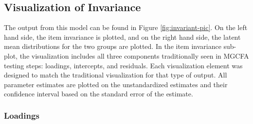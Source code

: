 \documentclass[
  man]{apa6}
\newenvironment{Shaded}{\begin{snugshade}}{\end{snugshade}}
\newcommand{\AttributeTok}[1]{\textcolor[rgb]{0.77,0.63,0.00}{#1}}
\newcommand{\CommentTok}[1]{\textcolor[rgb]{0.56,0.35,0.01}{\textit{#1}}}
\newcommand{\DecValTok}[1]{\textcolor[rgb]{0.00,0.00,0.81}{#1}}
\newcommand{\FunctionTok}[1]{\textcolor[rgb]{0.00,0.00,0.00}{#1}}
\newcommand{\NormalTok}[1]{#1}
\newcommand{\SpecialCharTok}[1]{\textcolor[rgb]{0.00,0.00,0.00}{#1}}
\newcommand{\StringTok}[1]{\textcolor[rgb]{0.31,0.60,0.02}{#1}}
\begin{document}
\small

\begin{Shaded}
\end{Shaded}

\normalsize

\hypertarget{visualization-of-invariance}{%
\subsection{Visualization of Invariance}\label{visualization-of-invariance}}

The output from this model can be found in Figure \ref{fig:invariant-pic}. On the left hand side, the item invariance is plotted, and on the right hand side, the latent mean distributions for the two groups are plotted. In the item invariance sub-plot, the visualization includes all three components traditionally seen in MGCFA testing steps: loadings, intercepts, and residuals. Each visualization element was designed to match the traditional visualization for that type of output. All parameter estimates are plotted on the unstandardized estimates and their confidence interval based on the standard error of the estimate.

\hypertarget{loadings}{%
\subsubsection{Loadings}\label{loadings}}
\end{document}
